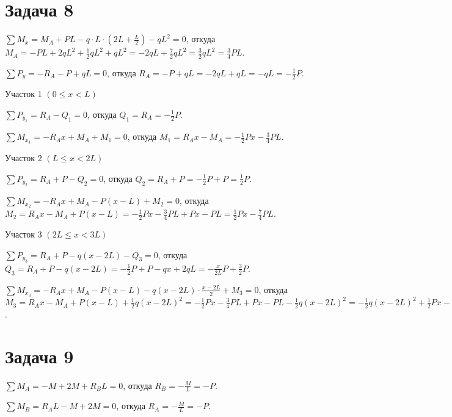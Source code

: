 \section{Задача 8}

$ \sum M_x = M_A + PL - q \cdot L \cdot \left(2L + \frac{L}{2}\right) - qL^2 = 0 $,
откуда $ M_A = -PL + 2qL^2 + \frac{1}{2}qL^2 + qL^2 = -2qL + \frac{7}{2}qL^2 = \frac{3}{2}qL^2 = \frac{3}{4}PL $.

$ \sum P_y = -R_A - P + qL = 0 $,
откуда $ R_A = -P + qL = -2qL + qL = -qL = -\frac{1}{2}P $.

\vspace{1.5ex}

Участок 1 $ \left(0 \le x < L\right) $

$ \sum P_{y_1} = R_A - Q_1 = 0 $,
откуда $ Q_1 = R_A = -\frac{1}{2}P $.

$ \sum M_{x_1} = -R_A x + M_A + M_1 = 0 $,
откуда $ M_1 = R_A x - M_A = -\frac{1}{2}Px - \frac{3}{4}PL $.

\vspace{1.5ex}

Участок 2 $ \left(L \le x < 2L\right) $

$ \sum P_{y_2} = R_A + P - Q_2 = 0 $,
откуда $ Q_2 = R_A + P = -\frac{1}{2}P + P = \frac{1}{2}P $.

$ \sum M_{x_2} = -R_A x + M_A - P(x - L) + M_2 = 0 $,
откуда $ M_2 = R_A x - M_A + P(x - L) = -\frac{1}{2}Px - \frac{3}{4}PL + Px - PL = \frac{1}{2}Px - \frac{7}{4}PL $.

\vspace{1.5ex}

Участок 3 $ \left(2L \le x < 3L\right) $

$ \sum P_{y_3} = R_A + P - q(x - 2L) - Q_3 = 0 $,
откуда $ Q_3 = R_A + P - q(x - 2L) = -\frac{1}{2}P + P - qx + 2qL = -\frac{x}{2L}P + \frac{3}{2}P $.

$ \sum M_{x_3} = -R_A x + M_A - P(x - L) - q(x - 2L) \cdot \frac{x-2L}{2} + M_3 = 0 $,
откуда $ M_3 = R_A x - M_A + P(x - L) + \frac{1}{2}q(x - 2L)^2 = -\frac{1}{2}Px - \frac{3}{4}PL + Px - PL - \frac{1}{2}q(x - 2L)^2 = -\frac{1}{2}q(x - 2L)^2 + \frac{1}{2}Px - \frac{7}{4}PL $.

\section{Задача 9}

$ \sum M_A = -M + 2M + R_B L = 0 $,
откуда $ R_B = -\frac{M}{L} = -P $.

$ \sum M_B = R_A L - M + 2M = 0 $,
откуда $ R_A = -\frac{M}{L} = -P $.

